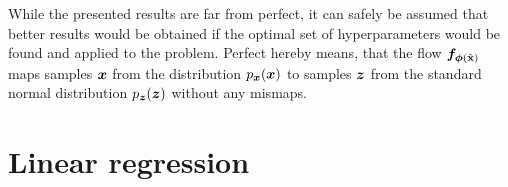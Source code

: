 \documentclass[a4paper,11pt]{report}
\def\fc#1{{\color{black}{#1}}} %
\begin{document}
While the presented results are far from perfect, it can safely be assumed that better results would be obtained if the optimal set of hyperparameters would be found and applied to the problem. Perfect hereby means, that the flow $\bm{f}_{\bm{\phi}(\hat{\boldsymbol{\mathbf{x}}})}$ maps samples $\bm{x}$ from the distribution $p_{\bm{x}}(\bm{x})$ to samples $\bm{z}$ from the standard normal distribution $p_{\bm{z}}(\bm{z})$ without any mismaps. \fc{Since the moons distribution is of a multimodal nature, a different choice of normalizing flow architecture would also be favorable. This is because the affine coupling layer type of normalizing flows is known to struggle at modeling multimodal probability densities.}

\FloatBarrier
\section{Linear regression}\label{sec:linearregression}
\end{document}
